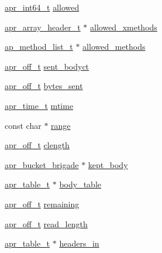 \begin{DoxyCompactItemize}
\item 
\hyperlink{group__apr__platform_ga4b75afbf973dc6c8aea4ae75b044aa08}{apr\+\_\+int64\+\_\+t} \hyperlink{structrequest__rec_ac3f24ef04a6c014e19496f85c74e2f88}{allowed}
\item 
\hyperlink{structapr__array__header__t}{apr\+\_\+array\+\_\+header\+\_\+t} $\ast$ \hyperlink{structrequest__rec_a9623190b146fa3e71d50c8345ed4d324}{allowed\+\_\+xmethods}
\item 
\hyperlink{structap__method__list__t}{ap\+\_\+method\+\_\+list\+\_\+t} $\ast$ \hyperlink{structrequest__rec_a945d2fe64db17f0ea384109c88b14065}{allowed\+\_\+methods}
\item 
\hyperlink{group__apr__platform_ga6938af9075cec15c88299109381aa984}{apr\+\_\+off\+\_\+t} \hyperlink{structrequest__rec_adaecc7e1375213f5bdbf3985dd55a341}{sent\+\_\+bodyct}
\item 
\hyperlink{group__apr__platform_ga6938af9075cec15c88299109381aa984}{apr\+\_\+off\+\_\+t} \hyperlink{structrequest__rec_a1c423f9f437b73f9ca95b4aa2e6bf62c}{bytes\+\_\+sent}
\item 
\hyperlink{group__apr__time_gadb4bde16055748190eae190c55aa02bb}{apr\+\_\+time\+\_\+t} \hyperlink{structrequest__rec_a3fa37c58bc8ca681e0f44957d9c5d823}{mtime}
\item 
const char $\ast$ \hyperlink{structrequest__rec_acb9feed7beb883807be44ee3011ebdf3}{range}
\item 
\hyperlink{group__apr__platform_ga6938af9075cec15c88299109381aa984}{apr\+\_\+off\+\_\+t} \hyperlink{structrequest__rec_adfad73aad6e5b1d51226774fe5b85c54}{clength}
\item 
\hyperlink{structapr__bucket__brigade}{apr\+\_\+bucket\+\_\+brigade} $\ast$ \hyperlink{structrequest__rec_a919609b0089e443b7a2f266faf75f656}{kept\+\_\+body}
\item 
\hyperlink{structapr__table__t}{apr\+\_\+table\+\_\+t} $\ast$ \hyperlink{structrequest__rec_a284246e22b93f5a15d3ce27861b785f9}{body\+\_\+table}
\item 
\hyperlink{group__apr__platform_ga6938af9075cec15c88299109381aa984}{apr\+\_\+off\+\_\+t} \hyperlink{structrequest__rec_a743212601ea2d2d9e202fbbac6867360}{remaining}
\item 
\hyperlink{group__apr__platform_ga6938af9075cec15c88299109381aa984}{apr\+\_\+off\+\_\+t} \hyperlink{structrequest__rec_acfbce388a8423071691689f34a894f9b}{read\+\_\+length}
\item 
\hyperlink{structapr__table__t}{apr\+\_\+table\+\_\+t} $\ast$ \hyperlink{structrequest__rec_ac10f60c706b7547e86d33dab4627c22c}{headers\+\_\+in}

\end{DoxyCompactItemize}
